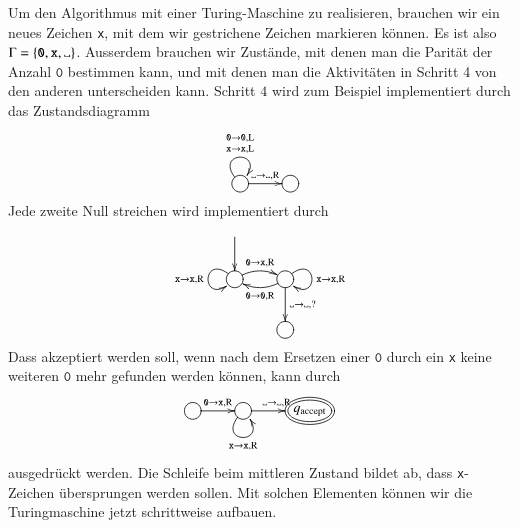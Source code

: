 Um den Algorithmus mit einer Turing-Maschine zu realisieren, brauchen wir
ein neues Zeichen {\tt x}, mit dem wir gestrichene Zeichen markieren
können. Es ist also $\Gamma = \{\texttt{0},{\tt x},\blank\}$.
Ausserdem brauchen wir
Zustände, mit denen man die Parität der Anzahl $\texttt{0}$ bestimmen kann, und
mit denen man die Aktivitäten in Schritt 4 von den anderen unterscheiden
kann. Schritt $4$ wird zum Beispiel implementiert durch das
Zustandsdiagramm
\[
\entrymodifiers={++[o][F]}
\xymatrix{
{}\ar@(ul,ur)^{\genfrac{}{}{0pt}{1}{\texttt{0}\to \texttt{0},\text{L}}{{\tt x}\to{\tt x},\text{L}}}
\ar[r]^{\blank\to\blank,\text{R}}
	&
}
\]
Jede zweite Null streichen wird implementiert durch
\[
\entrymodifiers={++[o][F]}
\xymatrix{
*+\txt{}\ar[d]
\\
\ar@/^/[r]^{\texttt{0}\to{\tt x},\text{R}}
\ar@(ul,dl)_{\tt x\to\tt x,\text{R}}
	&\ar@/^/[l]^{\texttt{0}\to \texttt{0},\text{R}}
         \ar@(ur,dr)^{\tt x\to\tt x,\text{R}}
	 \ar[d]^{\blank\to\blank,?}
\\
*+\txt{}
	&{}
}
\]
Dass akzeptiert werden soll, wenn nach dem Ersetzen einer $\texttt{0}$ durch
ein {\tt x} keine weiteren $\texttt{0}$ mehr gefunden werden können, kann durch
\[
\entrymodifiers={++[o][F]}
\xymatrix{
\ar[r]^{\texttt{0}\to{\tt x},\text{R}}
	&{} \ar@(dl,dr)_{{\tt x}\to{\tt x},\text{R}}
	    \ar[r]^{\blank\to\blank,\text{R}}
		&*++[o][F=]{q_{\text{accept}}}
}
\]
ausgedrückt werden. Die Schleife beim mittleren Zustand
bildet ab, dass {\tt x}-Zeichen übersprungen werden sollen.
Mit solchen Elementen können wir die Turingmaschine jetzt schrittweise
aufbauen.

